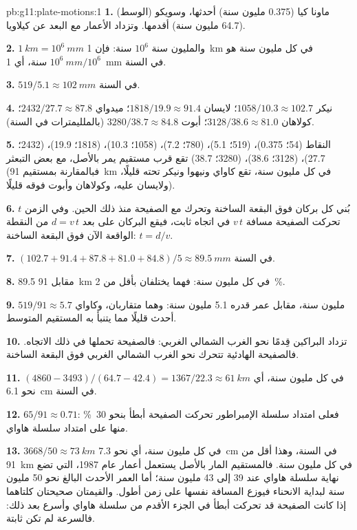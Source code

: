 \begin{solution}{pb:g11:plate-motions:1}
\textbf{1.} ماونا كيا (\num{0.375} مليون سنة) أحدثها، وسويكو
(الوسط) (\num{64.7} مليون سنة) أقدمها. وتزداد الأعمار مع
البعد عن كيلاويا.

\textbf{2.} $\qty{1}{km} = 10^6~\unit{mm}$ والمليون سنة $10^6$
سنة: فإن \qty{1}{km} في كل مليون سنة هو $10^6~\unit{mm}/10^6$ سنة،
أي \qty{1}{mm} في السنة.

\textbf{3.} $519/5.1 \approx \qty{102}{mm}$ في السنة.

\textbf{4.} نيكر $1058/10.3 \approx 102.7$؛ لايسان $1818/19.9 \approx
91.4$؛ ميدواي $2432/27.7 \approx 87.8$؛ كولاهان $3128/38.6 \approx 81.0$؛
أبوت $3280/38.7 \approx 84.8$ (بالملليمترات في السنة).

\textbf{5.} النقاط (54؛ 0.375)، (519؛ 5.1)، (780؛ 7.2)، (1058؛ 10.3)،
(1818؛ 19.9)، (2432؛ 27.7)، (3128؛ 38.6)، (3280؛ 38.7) تقع قرب مستقيم
يمر بالأصل، مع بعض التبعثر (فبالمقارنة بمستقيم \qty{91}{km} في كل
مليون سنة، تقع كاواي ونيهوا ونيكر تحته قليلًا، ولايسان عليه،
وكولاهان وأبوت فوقه قليلًا).

\textbf{6.} بُني كل بركان فوق البقعة الساخنة وتحرك مع
الصفيحة منذ ذلك الحين. وفي الزمن $t$ تحركت الصفيحة مسافة $v\,t$ في
اتجاه ثابت، فيقع البركان على بعد $d = v\,t$ من النقطة الواقعة الآن فوق
البقعة الساخنة: $t = d/v$.

\textbf{7.} $(102.7 + 91.4 + 87.8 + 81.0 + 84.8)/5 \approx \qty{89.5}{mm}$ في
السنة.

\textbf{8.} 89.5 مقابل \qty{91}{km} في كل مليون سنة: فهما يختلفان
بأقل من \qty{2}{\percent}.

\textbf{9.} $519/91 \approx 5.7$ مليون سنة، مقابل عمر قدره \num{5.1}
مليون سنة: وهما متقاربان، وكاواي أحدث قليلًا مما يتنبأ به
المستقيم المتوسط.

\textbf{10.} تزداد البراكين قِدمًا نحو الغرب الشمالي الغربي:
فالصفيحة تحملها في ذلك الاتجاه. فالصفيحة الهادئية تتحرك نحو
الغرب الشمالي الغربي فوق البقعة الساخنة.

\textbf{11.} $(4860 - 3493)/(64.7 - 42.4) = 1367/22.3 \approx \qty{61}{km}$
في كل مليون سنة، أي نحو \qty{6.1}{cm} في السنة.

\textbf{12.} $65/91 \approx 0.71$: فعلى امتداد سلسلة الإمبراطور تحركت الصفيحة
أبطأ بنحو \qty{30}{\percent} منها على امتداد سلسلة هاواي.

\textbf{13.} $3668/50 \approx \qty{73}{km}$ في كل مليون سنة، أي نحو
\qty{7.3}{cm} في السنة، وهذا أقل من \qty{91}{km} في كل مليون سنة. فالمستقيم المار بالأصل
يستعمل أعمار عام 1987، التي تضع نهاية سلسلة هاواي عند 39 إلى 43
مليون سنة؛ أما العمر الأحدث البالغ نحو 50 مليون سنة لبداية
الانحناء فيوزع المسافة نفسها على زمن أطول. والقيمتان صحيحتان كلتاهما إذا كانت الصفيحة
قد تحركت أبطأ في الجزء الأقدم من سلسلة هاواي وأسرع بعد ذلك:
فالسرعة لم تكن ثابتة.


\end{solution}
